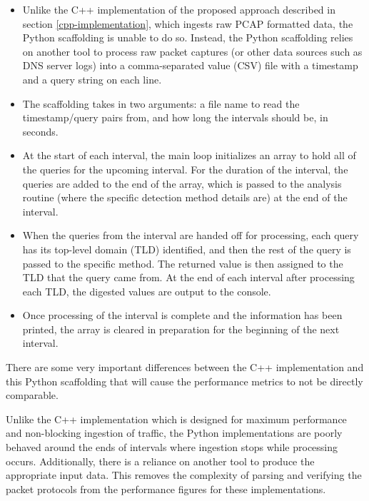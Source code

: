 \documentclass[12pt]{report}
\theoremstyle{remark}
\theoremstyle{definition}
\theoremstyle{definition}
\theoremstyle{definition}
\begin{document}
\begin{itemize} \item Unlike the C++ implementation of the proposed approach
described in section \ref{cpp-implementation}, which ingests raw PCAP formatted
data, the Python scaffolding is unable to do so. Instead, the Python scaffolding
relies on another tool to process raw packet captures (or other data sources
such as DNS server logs) into a comma-separated value (CSV) file with a
timestamp and a query string on each line.

\item The scaffolding takes in two arguments: a file name to read the
timestamp/query pairs from, and how long the intervals should be, in seconds.

\item At the start of each interval, the main loop initializes an array to hold
all of the queries for the upcoming interval. For the duration of the interval,
the queries are added to the end of the array, which is passed to the analysis
routine (where the specific detection method details are) at the end of the
interval.

\item When the queries from the interval are handed off for processing, each
query has its top-level domain (TLD) identified, and then the rest of the query
is passed to the specific method. The returned value is then assigned to the TLD
that the query came from. At the end of each interval after processing each TLD,
the digested values are output to the console.

\item Once processing of the interval is complete and the information has been
printed, the array is cleared in preparation for the beginning of the next
interval.

\end{itemize}

There are some very important differences between the C++ implementation and
this Python scaffolding that will cause the performance metrics to not be
directly comparable.

Unlike the C++ implementation which is designed for maximum performance and
non-blocking ingestion of traffic, the Python implementations are poorly behaved
around the ends of intervals where ingestion stops while processing occurs.
Additionally, there is a reliance on another tool to produce the appropriate 
input data. This removes the complexity of
parsing and verifying the packet protocols from the performance figures for
these implementations.
\end{document}
